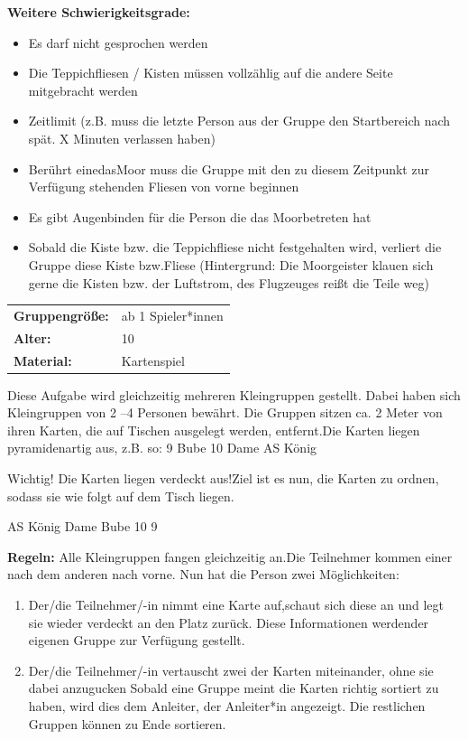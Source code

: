 \textbf{Weitere Schwierigkeitsgrade:}
\begin{itemize}
    \item Es darf nicht gesprochen werden
    \item Die Teppichfliesen / Kisten müssen vollzählig auf die andere Seite mitgebracht werden
    \item Zeitlimit (z.B. muss die letzte Person aus der Gruppe den Startbereich nach spät. X Minuten verlassen haben)
    \item Berührt einedasMoor muss die Gruppe mit den zu diesem Zeitpunkt zur Verfügung stehenden Fliesen von vorne beginnen
    \item Es gibt Augenbinden für die Person die das Moorbetreten hat
    \item Sobald die Kiste bzw. die Teppichfliese nicht festgehalten wird, verliert die Gruppe diese Kiste bzw.Fliese (Hintergrund: Die Moorgeister klauen sich gerne die Kisten bzw. der Luftstrom, des Flugzeuges reißt die Teile weg) 
\end{itemize}

\begin{table}[H]
\begin{tabular}{>{\bfseries}lp{8cm}}
   Gruppengröße:   & ab 1 Spieler*innen\\
    Alter: & 10 \\
    Material: & Kartenspiel \\ 
\end{tabular}
\end{table} 

Diese Aufgabe wird gleichzeitig mehreren Kleingruppen gestellt. Dabei haben sich Kleingruppen von 2 –4 Personen bewährt. Die Gruppen sitzen ca. 2 Meter von ihren Karten, die auf Tischen ausgelegt werden, entfernt.Die Karten liegen pyramidenartig aus, z.B. so:
9
Bube 10
Dame AS König

Wichtig! Die Karten liegen verdeckt aus!Ziel ist es nun, die Karten zu ordnen, sodass sie wie folgt auf dem Tisch liegen.

AS
König Dame
Bube 10 9

\textbf{Regeln:}
Alle Kleingruppen fangen gleichzeitig an.Die Teilnehmer kommen einer nach dem anderen nach vorne. Nun hat die Person zwei Möglichkeiten:
\begin{enumerate}
    \item Der/die Teilnehmer/-in nimmt eine Karte auf,schaut sich diese an und legt sie wieder verdeckt an den Platz zurück. Diese Informationen werdender eigenen Gruppe zur Verfügung gestellt.
    \item Der/die Teilnehmer/-in vertauscht zwei der
Karten miteinander, ohne sie dabei anzugucken Sobald eine Gruppe meint die Karten richtig sortiert zu haben, wird dies dem Anleiter, der Anleiter*in angezeigt. Die restlichen Gruppen können zu Ende sortieren.
\end{enumerate}

